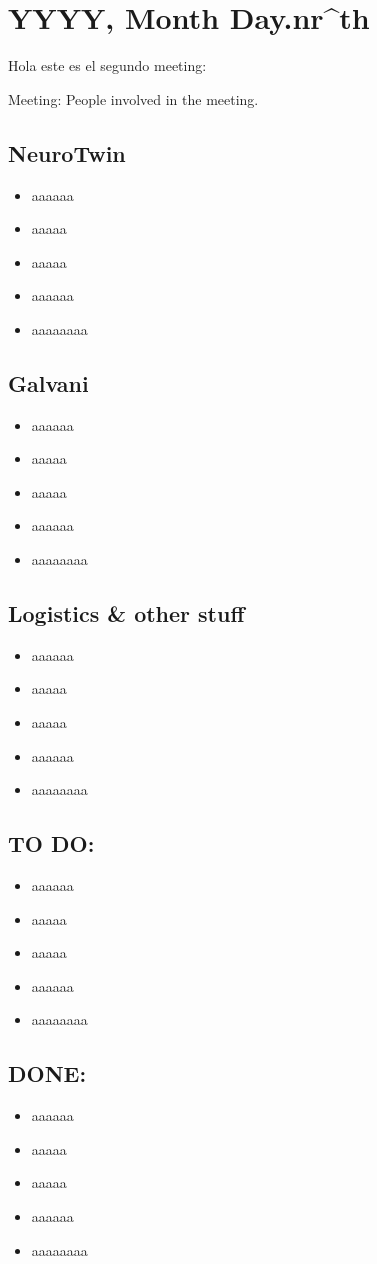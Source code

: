 
\section{YYYY, Month Day.nr^{th}}
Hola este es el segundo meeting:

Meeting: People involved in the meeting.

\subsection{NeuroTwin}
\begin{itemize}
    \item aaaaaa
    \item aaaaa
    \item aaaaa
    \item aaaaaa
    \item aaaaaaaa
\end{itemize}


\subsection{Galvani}
\begin{itemize}
    \item aaaaaa
    \item aaaaa
    \item aaaaa
    \item aaaaaa
    \item aaaaaaaa
\end{itemize}

\subsection{Logistics \&  other stuff}
\begin{itemize}
    \item aaaaaa
    \item aaaaa
    \item aaaaa
    \item aaaaaa
    \item aaaaaaaa
\end{itemize}

\subsection{TO DO:}
\begin{itemize}
    \item aaaaaa
    \item aaaaa
    \item aaaaa
    \item aaaaaa
    \item aaaaaaaa
\end{itemize}

\subsection{DONE:}
\begin{itemize}
    \item aaaaaa
    \item aaaaa
    \item aaaaa
    \item aaaaaa
    \item aaaaaaaa
\end{itemize}